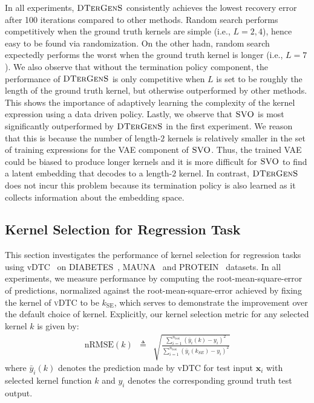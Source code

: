 In all experiments, $\textsc{DTerGenS}$ consistently achieves the lowest recovery error after 100 iterations compared to other methods. Random search performs competitively when the ground truth kernels are simple (i.e., $L=2,4$), hence easy to be found via randomization. On the other hadn, random search expectedly performs the worst when the ground truth kernel is longer (i.e., $L=7$). We also observe that without the termination policy component, the performance of $\textsc{DTerGenS}$ is only competitive when $L$ is set to be roughly the length of the ground truth kernel, but otherwise outperformed by other methods. This shows the importance of adaptively learning the complexity of the kernel expression using a data driven policy. Lastly, we observe that $\textsc{SVO}$ is most significantly outperformed by $\textsc{DTerGenS}$ in the first
experiment. We reason that this is because the number of length-$2$ kernels is relatively smaller in the set of training expressions for the VAE component of $\textsc{SVO}$. Thus, the trained VAE could be biased to produce longer kernels and it is more difficult for $\textsc{SVO}$ to find a latent embedding that decodes to a length-$2$ kernel. In contrast, $\textsc{DTerGenS}$ does not incur this problem because its termination policy is also learned as it collects information about the embedding space.
\subsection{Kernel Selection for Regression Task}
This section investigates the performance of kernel selection for regression tasks using vDTC~\cite{Hensman13} on DIABETES~\cite{UCI_diabetes_data}, MAUNA~\cite{mauna_loa_data} and PROTEIN~\cite{UCI_protein_data} datasets. In all experiments, we measure performance by computing the root-mean-square-error of predictions, normalized against the root-mean-square-error achieved by fixing the kernel of \textsc{vDTC} to be $k_{\mathrm{SE}}$, which serves to demonstrate the improvement over the default choice of kernel. Explicitly, our kernel selection metric for any selected kernel $k$ is given by:
\begin{eqnarray}
\mathrm{nRMSE}(k) &\triangleq& \sqrt{\frac{\sum_{i=1}^{n_{\mathrm{test}}} \left(\bar{y}_i(k) - y_i\right)^2 }{\sum_{i=1}^{n_{\mathrm{test}}} \left(\bar{y}_i(k_{SE}) - y_i\right)^2}}
\end{eqnarray}
where $\bar{y}_i(k)$ denotes the prediction made by vDTC for test input $\mathbf{x}_i$ with selected kernel function $k$ and $y_i$ denotes the corresponding ground truth test output. 

